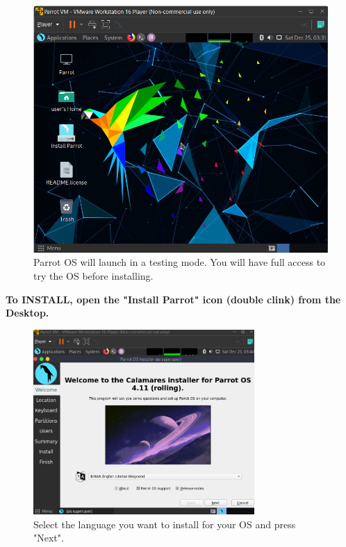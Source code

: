 \documentclass[a4paper]{article}
\begin{document}
    \clearpage
    \begin{figure}[h]
        \centering 
        \includegraphics[width=\textwidth, keepaspectratio]{Images/Install_OS/OS_2.png}
        \caption{Parrot OS will launch in a testing mode. You will have full access to try the OS before installing.}
    \end{figure}

    \vfill

    \begin{tcolorbox}[colback=blue!5!white,colframe=blue!75!black]
        \centering
        \textbf{To INSTALL, open the "Install Parrot" icon (double clink) from the Desktop.}
    \end{tcolorbox}

    \vfill

    \clearpage
    \begin{figure}[h]
        \centering
        \includegraphics[width=0.75\textwidth]{Images/Install_OS/OS_3.png}
        \caption{Select the language you want to install for your OS and press "Next".}
    \end{figure}
\end{document}
